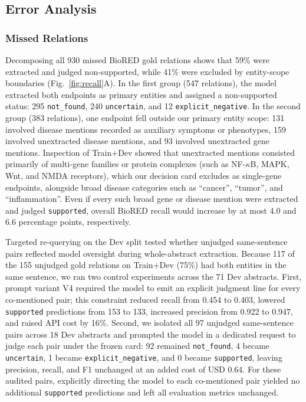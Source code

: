 \documentclass[preprint,10pt,letterpaper]{elsarticle}
\newcommand{\st}[1]{\texttt{#1}}             %
\begin{document}
\subsection{Error Analysis}

\subsubsection{Missed Relations}
Decomposing all 930 missed BioRED gold relations shows that 59\% were extracted and judged non-supported, while 41\% were excluded by entity-scope boundaries (Fig.~\ref{fig:recall}A). In the first group (547 relations), the model extracted both endpoints as primary entities and assigned a non-supported status: 295 \st{not\_found}, 240 \st{uncertain}, and 12 \st{explicit\_negative}. In the second group (383 relations), one endpoint fell outside our primary entity scope: 131 involved disease mentions recorded as auxiliary symptoms or phenotypes, 159 involved unextracted disease mentions, and 93 involved unextracted gene mentions. Inspection of Train+Dev showed that unextracted mentions consisted primarily of multi-gene families or protein complexes (such as NF-$\kappa$B, MAPK, Wnt, and NMDA receptors), which our decision card excludes as single-gene endpoints, alongside broad disease categories such as ``cancer'', ``tumor'', and ``inflammation''. Even if every such broad gene or disease mention were extracted and judged \st{supported}, overall BioRED recall would increase by at most 4.0 and 6.6 percentage points, respectively.

Targeted re-querying on the Dev split tested whether unjudged same-sentence pairs reflected model oversight during whole-abstract extraction. Because 117 of the 155 unjudged gold relations on Train+Dev (75\%) had both entities in the same sentence, we ran two control experiments across the 71 Dev abstracts. First, prompt variant V4 required the model to emit an explicit judgment line for every co-mentioned pair; this constraint reduced recall from 0.454 to 0.403, lowered \st{supported} predictions from 153 to 133, increased precision from 0.922 to 0.947, and raised API cost by 16\%. Second, we isolated all 97 unjudged same-sentence pairs across 18 Dev abstracts and prompted the model in a dedicated request to judge each pair under the frozen card: 92 remained \st{not\_found}, 4 became \st{uncertain}, 1 became \st{explicit\_negative}, and 0 became \st{supported}, leaving precision, recall, and F1 unchanged at an added cost of USD 0.64. For these audited pairs, explicitly directing the model to each co-mentioned pair yielded no additional \st{supported} predictions and left all evaluation metrics unchanged.
\end{document}
